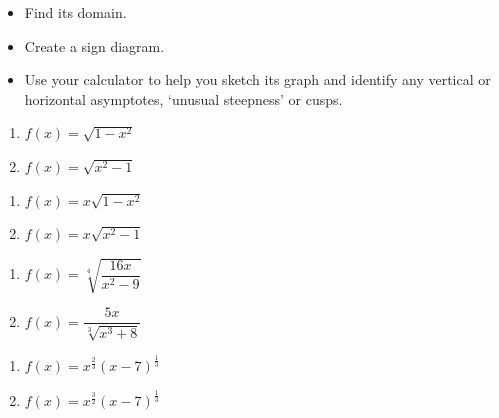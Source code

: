 \begin{itemize}

\item Find its domain.
\item Create a sign diagram.
\item Use your calculator to help you sketch its graph and identify any vertical or horizontal asymptotes, `unusual steepness' or cusps.

\end{itemize}

\begin{multicols}{2}
\begin{enumerate}

\item $f(x) = \sqrt{1 - x^{2}}$ \label{algfcngraphexfirst}
\item $f(x) = \sqrt{x^2-1}$

\setcounter{HW}{\value{enumi}}
\end{enumerate}
\end{multicols}

\begin{multicols}{2}
\begin{enumerate}
\setcounter{enumi}{\value{HW}}

\item $f(x) = x \sqrt{1-x^2}$
\item $f(x) = x \sqrt{x^2-1}$

\setcounter{HW}{\value{enumi}}
\end{enumerate}
\end{multicols}

\begin{multicols}{2}
\begin{enumerate}
\setcounter{enumi}{\value{HW}}

\item $f(x) = \sqrt[4]{\dfrac{16x}{x^{2} - 9}}$
\item $f(x) = \dfrac{5x}{\sqrt[3]{x^{3} + 8}}$
\setcounter{HW}{\value{enumi}}
\end{enumerate}
\end{multicols}

\begin{multicols}{2}
\begin{enumerate}
\setcounter{enumi}{\value{HW}}

\item $f(x) = x^{\frac{2}{3}}(x - 7)^{\frac{1}{3}}$
\item $f(x) = x^{\frac{3}{2}}(x - 7)^{\frac{1}{3}}$


\setcounter{HW}{\value{enumi}}
\end{enumerate}
\end{multicols}

